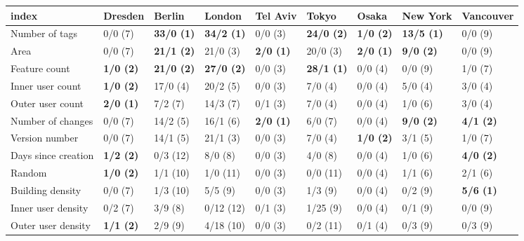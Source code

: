 \begin{tabular}{lllllllll}
\toprule
               index &           Dresden &             Berlin &             London &          Tel Aviv &              Tokyo &             Osaka &           New York &         Vancouver \\
\midrule
      Number of tags &           0/0 (7) &  \textbf{33/0 (1)} &  \textbf{34/2 (1)} &           0/0 (3) &  \textbf{24/0 (2)} &  \textbf{1/0 (2)} &  \textbf{13/5 (1)} &           0/0 (9) \\
                Area &           0/0 (7) &  \textbf{21/1 (2)} &           21/0 (3) &  \textbf{2/0 (1)} &           20/0 (3) &  \textbf{2/0 (1)} &   \textbf{9/0 (2)} &           0/0 (9) \\
       Feature count &  \textbf{1/0 (2)} &  \textbf{21/0 (2)} &  \textbf{27/0 (2)} &           0/0 (3) &  \textbf{28/1 (1)} &           0/0 (4) &            0/0 (9) &           1/0 (7) \\
    Inner user count &  \textbf{1/0 (2)} &           17/0 (4) &           20/2 (5) &           0/0 (3) &            7/0 (4) &           0/0 (4) &            5/0 (4) &           3/0 (4) \\
    Outer user count &  \textbf{2/0 (1)} &            7/2 (7) &           14/3 (7) &           0/1 (3) &            7/0 (4) &           0/0 (4) &            1/0 (6) &           3/0 (4) \\
   Number of changes &           0/0 (7) &           14/2 (5) &           16/1 (6) &  \textbf{2/0 (1)} &            6/0 (7) &           0/0 (4) &   \textbf{9/0 (2)} &  \textbf{4/1 (2)} \\
      Version number &           0/0 (7) &           14/1 (5) &           21/1 (3) &           0/0 (3) &            7/0 (4) &  \textbf{1/0 (2)} &            3/1 (5) &           1/0 (7) \\
 Days since creation &  \textbf{1/2 (2)} &           0/3 (12) &            8/0 (8) &           0/0 (3) &            4/0 (8) &           0/0 (4) &            1/0 (6) &  \textbf{4/0 (2)} \\
              Random &  \textbf{1/0 (2)} &           1/1 (10) &           1/0 (11) &           0/0 (3) &           0/0 (11) &           0/0 (4) &            1/1 (6) &           2/1 (6) \\
    Building density &           0/0 (7) &           1/3 (10) &            5/5 (9) &           0/0 (3) &            1/3 (9) &           0/0 (4) &            0/2 (9) &  \textbf{5/6 (1)} \\
  Inner user density &           0/2 (7) &            3/9 (8) &          0/12 (12) &           0/1 (3) &           1/25 (9) &           0/0 (4) &            0/1 (9) &           0/0 (9) \\
  Outer user density &  \textbf{1/1 (2)} &            2/9 (9) &          4/18 (10) &           0/0 (3) &           0/2 (11) &           0/1 (4) &            0/3 (9) &           0/3 (9) \\
\bottomrule
\end{tabular}
